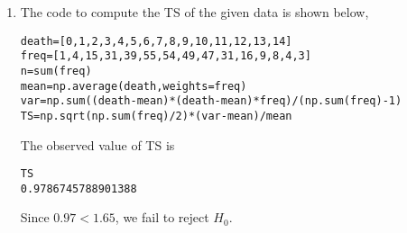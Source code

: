 \documentclass[11pt]{article}
\begin{document}
\begin{enumerate}
\begin{enumerate}
\end{enumerate}
\newpage
\item
The code to compute the TS of the given data is shown below, 
\begin{lstlisting}[frame=single]
death=[0,1,2,3,4,5,6,7,8,9,10,11,12,13,14]
freq=[1,4,15,31,39,55,54,49,47,31,16,9,8,4,3]
n=sum(freq)
mean=np.average(death,weights=freq)
var=np.sum((death-mean)*(death-mean)*freq)/(np.sum(freq)-1)
TS=np.sqrt(np.sum(freq)/2)*(var-mean)/mean
\end{lstlisting}
The observed value of TS is 
\begin{lstlisting}[frame=single]
TS
0.9786745788901388
\end{lstlisting}
Since $0.97<1.65$, we fail to reject $H_0$. 
\end{enumerate}
\end{document}
